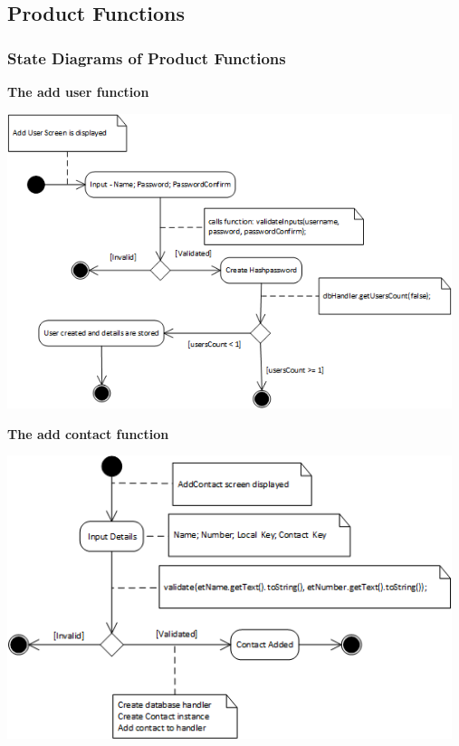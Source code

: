 \subsection{Product Functions}
\subsubsection{State Diagrams of Product Functions}

\begin{center}
\textbf{The add user function\\}
\end{center}
 \includegraphics[width=13cm]{diagrams/StateDiagrams/AddUserStateDiagram.png}
\textbf{\\}
\begin{center}
\textbf{The add contact function\\}
\end{center}
 \includegraphics[width=13cm]{diagrams/StateDiagrams/AddContactStateDiagram.png}
